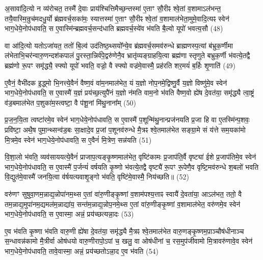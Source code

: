 {\anuvakamend[{अ॒भि खलु॒ वृष्टि॒श्छन्द॑सामे॒व रसे॑न प्र॒जामव॑ वैश्वदे॒वा वै ब्र॑ह्मवर्च॒सं यूप॒ एका॒न्नविꣳ॑श॒तिश्च॑। (7)।}]}

अ॒सावा॑दि॒त्यो न व्य॑रोचत॒ तस्मै॑ दे॒वाः प्राय॑श्चित्तिमैच्छ॒न्तस्मा॑ ए॒ताꣳ सौ॒रीꣴ श्वे॒तां व॒शामा\-ऽल॑भन्त॒ तयै॒वास्मि॒न्रुच॑मदधु॒र्यो ब्र॑ह्मवर्च॒सका॑मः॒ स्यात्तस्मा॑ ए॒ताꣳ सौ॒रीꣴ श्वे॒तां व॒शामाल॑भेता॒मुमे॒वादि॒त्यꣴ स्वेन॑ भाग॒धेये॒नोप॑धावति॒ स ए॒वास्मि॑न्ब्रह्मवर्च॒सन्द॑धाति ब्रह्मवर्च॒स्ये॑व भ॑वति बै॒ल्\mbox{}वो यूपो॑ भवत्य॒सौ (48)

वा आ॑दि॒त्यो यतो\-ऽजा॑यत॒ ततो॑ बि॒ल्व॑ उद॑तिष्ठ॒थ्सयो᳚न्ये॒व ब्र॑ह्मवर्च॒समव॑रुन्धे ब्राह्मणस्प॒त्यां ब॑भ्रुक॒र्णीमा ल॑भेताभि॒चर॑न्वारु॒णन्दश॑कपालं पु॒रस्ता॒न्निर्व॑पे॒द्वरु॑णेनै॒व भ्रातृ॑व्यङ्ग्राहयि॒त्वा ब्रह्म॑णा स्तृणुते बभ्रुक॒र्णी भ॑वत्ये॒तद्वै ब्रह्म॑णो रू॒पꣳ समृ॑द्ध्यै॒ स्फ्यो यूपो॑ भवति॒ वज्रो॒ वै स्फ्यो वज्र॑मे॒वास्मै॒ प्रह॑रति शर॒मयं॑ ब॒र्\mbox{}हिः शृ॒णाति॑ (49)

ए॒वैनं॒ वैभी॑दक इ॒द्ध्मो भि॒नत्त्ये॒वैनं॑ वैष्ण॒वं वा॑म॒नमाल॑भेत॒ यं य॒ज्ञो नोप॒नमे॒द्विष्णु॒र्वै य॒ज्ञो विष्णु॑मे॒व स्वेन॑ भाग॒धेये॒नोप॑धावति॒ स ए॒वास्मै॑ य॒ज्ञं प्रय॑च्छ॒त्युपै॑नं य॒ज्ञो न॑मति वाम॒नो भ॑वति वैष्ण॒वो ह्ये॑ष दे॒वत॑या॒ समृ॑द्ध्यै त्वा॒ष्ट्रं व॑ड॒बमाल॑भेत प॒शुका॑म॒स्त्वष्टा॒ वै प॑शू॒नां मि॑थु॒नाना᳚म् (50)

प्र॒ज॒न॒यि॒ता त्वष्टा॑रमे॒व स्वेन॑ भाग॒धेये॒नोप॑धावति॒ स ए॒वास्मै॑ प॒शून्मि॑थु॒नान्प्रज॑नयति प्र॒जा हि वा ए॒तस्मि॑न्प॒शवः॒ प्रवि॑ष्टा॒ अथै॒ष पुमा॒न्थ्सन्व॑ड॒बः सा॒क्षादे॒व प्र॒जां प॒शूनव॑रुन्धे मै॒त्रꣴ श्वे॒तमाल॑भेत सङ्ग्रा॒मे सं य॑त्ते सम॒यका॑मो मि॒त्रमे॒व स्वेन॑ भाग॒धेये॒नोप॑धावति॒ स ए॒वैनं॑ मि॒त्रेण॒ सन्न॑यति (51)

वि॒शा॒लो भ॑वति॒ व्यव॑साययत्ये॒वैनं॑ प्राजाप॒त्यङ्कृ॒ष्णमाल॑भेत॒ वृष्टि॑कामः प्र॒जाप॑ति॒र्वै वृष्ट्या॑ ईशे प्र॒जाप॑तिमे॒व स्वेन॑ भाग॒धेये॒नोप॑धावति॒ स ए॒वास्मै॑ प॒र्जन्यं॑ वर्\mbox{}षयति कृ॒ष्णो भ॑वत्ये॒तद्वै वृष्ट्यै॑ रू॒पꣳ रू॒पेणै॒व वृष्टि॒मव॑रुन्धे श॒बलो॑ भवति वि॒द्युत॑मे॒वास्मै॑ जनयि॒त्वा व॑र्\mbox{}षयत्यवाशृ॒ङ्गो भ॑वति॒ वृष्टि॑मे॒वास्मै॒ निय॑च्छति॥ (52)

{\anuvakamend{श़ृ॒णाति॑ मिथु॒नाना᳚न्नयति यच्छति॥]}}

वरु॑णꣳ सुषुवा॒णम॒न्नाद्य॒न्नोपा॑नम॒थ्स ए॒तां वा॑रु॒णीङ्कृ॒ष्णां व॒शाम॑पश्य॒त्ताꣴ स्वायै॑ दे॒वता॑या॒ आ\-ऽल॑भत॒ ततो॒ वै तम॒न्नाद्य॒मुपा॑नम॒द्यमल॑म॒न्नाद्या॑य॒ सन्त॑म॒न्नाद्य॒न्नोप॒नमे॒थ्स ए॒तां वा॑रु॒णीङ्कृ॒ष्णां व॒शामाल॑भेत॒ वरु॑णमे॒व स्वेन॑ भाग॒धेये॒नोप॑धावति॒ स ए॒वास्मा॒ अन्नं॒ प्रय॑च्छत्यन्ना॒दः (53)

ए॒व भ॑वति कृ॒ष्णा भ॑वति वारु॒णी ह्ये॑षा दे॒वत॑या॒ समृ॑द्ध्यै मै॒त्रꣴ श्वे॒तमाल॑भेत वारु॒णङ्कृ॒ष्णम॒पा़ञ्चौष॑धीनाञ्च स॒न्धावन्न॑कामो मै॒त्रीर्वा ओष॑धयो वारु॒णीरापो॒\-ऽपां च॒ खलु॒ वा ओष॑धीनां च॒ रस॒मुप॑जीवामो मि॒त्रावरु॑णावे॒व स्वेन॑ भाग॒धेये॒नोप॑धावति॒ तावे॒वास्मा॒ अन्नं॒ प्रय॑च्छतो\-ऽन्ना॒द ए॒व भ॑वति (54)

